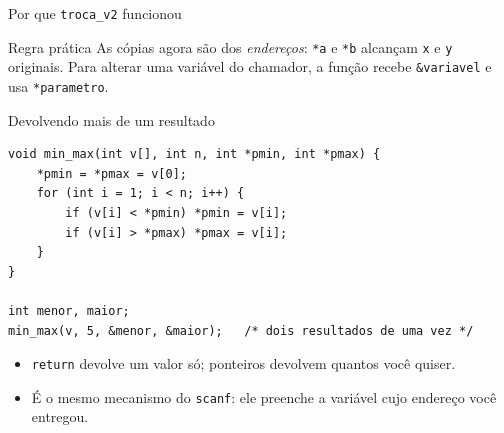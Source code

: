 \documentclass[aspectratio=169]{beamer}
\begin{document}
\begin{frame}{Por que \texttt{troca\_v2} funcionou}
  \begin{center}
  \end{center}
  \begin{block}{Regra prática}
    As cópias agora são dos \emph{endereços}: \texttt{*a} e \texttt{*b}
    alcançam \texttt{x} e \texttt{y} originais. Para alterar uma variável do
    chamador, a função recebe \texttt{\&variavel} e usa \texttt{*parametro}.
  \end{block}
\end{frame}

\begin{frame}[fragile]{Devolvendo mais de um resultado}
\begin{lstlisting}
void min_max(int v[], int n, int *pmin, int *pmax) {
    *pmin = *pmax = v[0];
    for (int i = 1; i < n; i++) {
        if (v[i] < *pmin) *pmin = v[i];
        if (v[i] > *pmax) *pmax = v[i];
    }
}

int menor, maior;
min_max(v, 5, &menor, &maior);   /* dois resultados de uma vez */
\end{lstlisting}
  \begin{itemize}
    \item \texttt{return} devolve um valor só; ponteiros devolvem quantos você quiser.
    \item É o mesmo mecanismo do \texttt{scanf}: ele preenche a variável cujo
      endereço você entregou.
  \end{itemize}
\end{frame}
\end{document}

